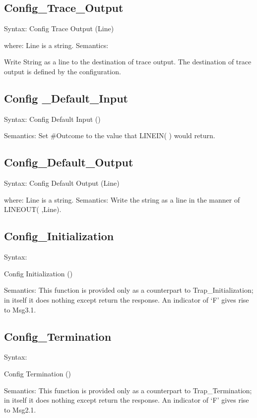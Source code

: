 \subsection{Config\_Trace\_Output}\label{config_trace_output}

Syntax: Config Trace Output (Line)

where: Line is a string. Semantics:

Write String as a line to the destination of trace output. The
destination of trace output is defined by the configuration.

\subsection{Config \_Default\_Input}\label{config-_default_input}

Syntax: Config Default Input ()

Semantics: Set \#Outcome to the value that LINEIN( ) would return.

\subsection{Config\_Default\_Output}\label{config_default_output}

Syntax: Config Default Output (Line)

where: Line is a string. Semantics: Write the string as a line in the
manner of LINEOUT( ,Line).

\subsection{Config\_Initialization}\label{config_initialization}

Syntax:

Config Initialization ()

Semantics: This function is provided only as a counterpart to
Trap\_Initialization; in itself it does nothing except return the
response. An indicator of `F' gives rise to Msg3.1.

\subsection{Config\_Termination}\label{config_termination}

Syntax:

Config Termination ()

Semantics: This function is provided only as a counterpart to
Trap\_Termination; in itself it does nothing except return the response.
An indicator of `F' gives rise to Msg2.1.

